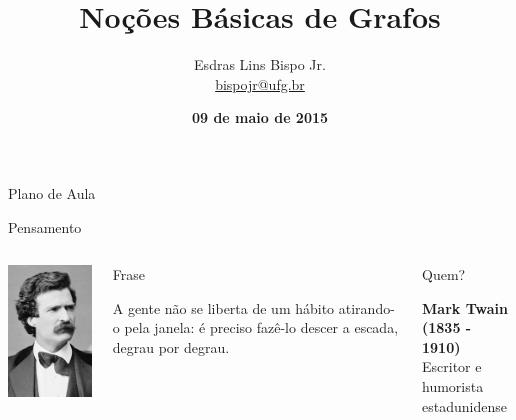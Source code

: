 \documentclass[xcolor=dvipsnames,table]{beamer}
\title{Noções Básicas de Grafos}
\author{
  Esdras Lins Bispo Jr. \\ \url{bispojr@ufg.br}
  }
\institute{
  Teoria de Grafos \\Bacharelado em Ciência da Computação}
\date{\textbf{09 de maio de 2015} }
\begin{document}
	\begin{frame}
		\titlepage
	\end{frame}

	\AtBeginSection{
		\begin{frame}{Sumário}%
    		\tableofcontents[currentsection]
		\end{frame}
	}

	\begin{frame}{Plano de Aula}
		\tableofcontents
	\end{frame}
    
    \begin{frame}{Pensamento}
		\begin{columns}
		  		\begin{center}
		    		\includegraphics[height=.8\textheight]{images/mark.jpg}
		  		\end{center}
				\begin{block}{Frase}
					\begin{center}
						{\large A gente não se liberta de um hábito atirando-o pela janela: é preciso fazê-lo descer a escada, degrau por degrau.}
					\end{center}
				\end{block}		  		
		  		\begin{block}{Quem?}
		  			\begin{center}
						{\bf Mark Twain (1835 - 1910)} \\Escritor e humorista estadunidense
					\end{center}
				\end{block}
		\end{columns}
	\end{frame}
    
\end{document}
